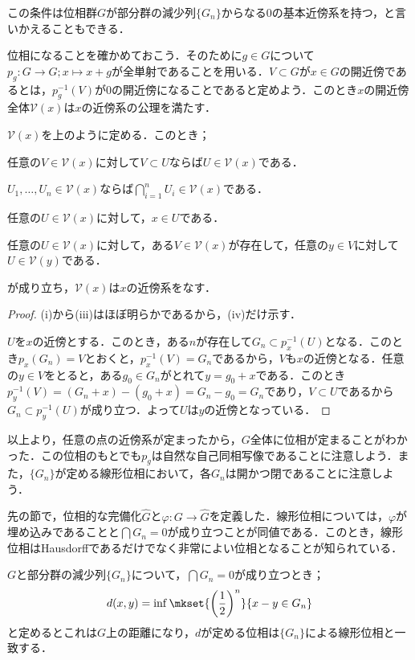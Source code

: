 この条件は位相群$G$が部分群の減少列$\{G_n\}$からなる$0$の基本近傍系を持つ，と言いかえることもできる．

位相になることを確かめておこう．そのために$g\in G$について$p_g:G\to G;x\mapsto x+g$が全単射であることを用いる．$V\subset G$が$x\in G$の開近傍であるとは，$p_g^{-1}(V)$が$0$の開近傍になることであると定めよう．このとき$x$の開近傍全体$\mathcal{V}(x)$は$x$の近傍系の公理を満たす．

\begin{lem}
	$\mathcal{V}(x)$を上のように定める．このとき；
	\begin{sakura}
		\item 任意の$V\in\mathcal{V}(x)$に対して$V\subset U$ならば$U\in\mathcal{V}(x)$である．
		\item $U_1,\dots,U_n\in\mathcal{V}(x)$ならば$\bigcap_{i=1}^n U_i\in\mathcal{V}(x)$である．
		\item 任意の$U\in\mathcal{V}(x)$に対して，$x\in U$である．
		\item 任意の$U\in\mathcal{V}(x)$に対して，ある$V\in\mathcal{V}(x)$が存在して，任意の$y\in V$に対して$U\in\mathcal{V}(y)$である．
	\end{sakura}
	が成り立ち，$\mathcal{V}(x)$は$x$の近傍系をなす．
\end{lem}

\begin{proof}
	(i)から(iii)はほぼ明らかであるから，(iv)だけ示す．
	
	$U$を$x$の近傍とする．このとき，ある$n$が存在して$G_n\subset p_x^{-1}(U)$となる．このとき$p_x(G_n)=V$とおくと，$p_x^{-1}(V)=G_n$であるから，$V$も$x$の近傍となる．任意の$y\in V$をとると，ある$g_0\in G_n$がとれて$y=g_0+x$である．このとき$p_y^{-1}(V)=(G_n+x)-(g_0+x)=G_n-g_0=G_n$であり，$V\subset U$であるから$G_n\subset p_y^{-1}(U)$が成り立つ．よって$U$は$y$の近傍となっている．
\end{proof}

以上より，任意の点の近傍系が定まったから，$G$全体に位相が定まることがわかった．この位相のもとでも$p_g$は自然な自己同相写像であることに注意しよう．また，$\{G_n\}$が定める線形位相において，各$G_n$は開かつ閉であることに注意しよう．

先の節で，位相的な完備化$\widehat{G}$と$\varphi:G\to\widehat{G}$を定義した．線形位相については，$\varphi$が埋め込みであることと$\bigcap G_n=0$が成り立つことが同値である．このとき，線形位相はHausdorffであるだけでなく非常によい位相となることが知られている．

\begin{prop}
	$G$と部分群の減少列$\{G_n\}$について，$\bigcap G_n=0$が成り立つとき；
	\[d(x,y)=\inf\mkset{\left(\frac{1}{2}\right)^n}{x-y\in G_n}\]
	と定めるとこれは$G$上の距離になり，$d$が定める位相は$\{G_n\}$による線形位相と一致する．
\end{prop}

